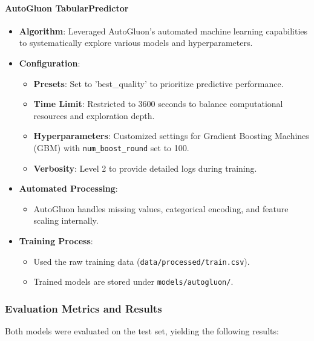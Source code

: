 \documentclass{article}
\begin{document}
\paragraph{AutoGluon TabularPredictor}

\begin{itemize}[leftmargin=*]
    \item \textbf{Algorithm}: Leveraged AutoGluon's automated machine learning capabilities to systematically explore various models and hyperparameters.
    \item \textbf{Configuration}:
        \begin{itemize}[leftmargin=*]
            \item \textbf{Presets}: Set to 'best\_quality' to prioritize predictive performance.
            \item \textbf{Time Limit}: Restricted to 3600 seconds to balance computational resources and exploration depth.
            \item \textbf{Hyperparameters}: Customized settings for Gradient Boosting Machines (GBM) with \texttt{num\_boost\_round} set to 100.
            \item \textbf{Verbosity}: Level 2 to provide detailed logs during training.
        \end{itemize}
    \item \textbf{Automated Processing}:
        \begin{itemize}[leftmargin=*]
            \item AutoGluon handles missing values, categorical encoding, and feature scaling internally.
        \end{itemize}
    \item \textbf{Training Process}:
        \begin{itemize}[leftmargin=*]
            \item Used the raw training data (\texttt{data/processed/train.csv}).
            \item Trained models are stored under \texttt{models/autogluon/}.
        \end{itemize}
\end{itemize}

\subsubsection{Evaluation Metrics and Results}

Both models were evaluated on the test set, yielding the following results:
\end{document}
